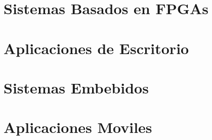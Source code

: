 \documentclass[aspectratio=169,compress]{beamer}
\begin{document}
\section{Sistemas Basados en FPGAs}








\section{Aplicaciones de Escritorio}


%

%


\section{Sistemas Embebidos}
%

%



\section{Aplicaciones Moviles}

\end{document}
